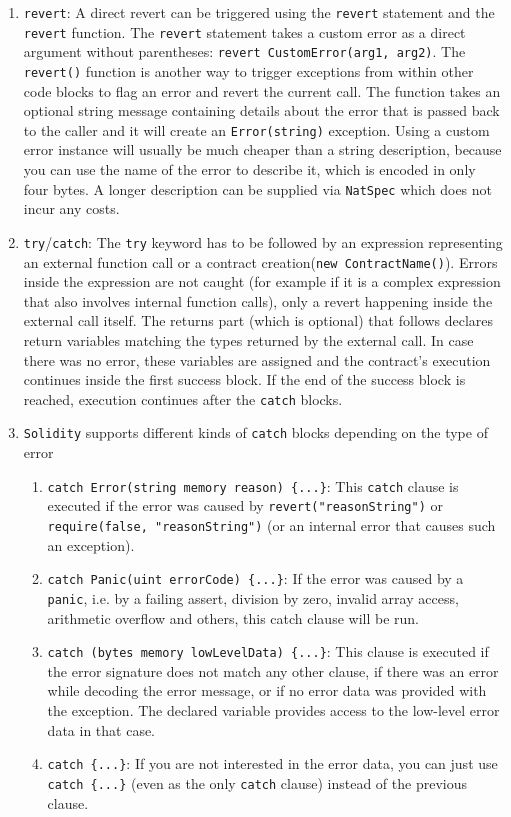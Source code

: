\begin{enumerate}
\item\verb|revert|: A direct revert can be triggered using the \verb|revert| statement and the \verb|revert| function. The \verb|revert| statement takes a custom error as a direct argument without parentheses: \verb|revert CustomError(arg1, arg2)|. The \verb|revert()| function is another way to trigger exceptions from within other code blocks to flag an error and revert the current call. The function takes an optional string message containing details about the error that is passed back to the caller and it will create an \verb|Error(string)| exception. Using a custom error instance will usually be much cheaper than a string description, because you can use the name of the error to describe it, which is encoded in only four bytes. A longer description can be supplied via \verb|NatSpec| which does not incur any costs.

\item\verb|try|/\verb|catch|: The \verb|try| keyword has to be followed by an expression representing an external function call or a contract creation\linebreak(\verb|new ContractName()|). Errors inside the expression are not caught (for example if it is a complex expression that also involves internal function calls), only a revert happening inside the external call itself. The returns part (which is optional) that follows declares return variables matching the types returned by the external call. In case there was no error, these variables are assigned and the contract’s execution continues inside the first success block. If the end of the success block is reached, execution continues after the \verb|catch| blocks.

\item\verb|Solidity| supports different kinds of \verb|catch| blocks depending on the type of error
    \begin{enumerate}
    \item\verb|catch Error(string memory reason) {...}|: This \verb|catch| clause is executed if the error was caused by \verb|revert("reasonString")| or \verb|require(false, "reasonString")| (or an internal error that causes such an exception).
    \item\verb|catch Panic(uint errorCode) {...}|: If the error was caused by a \verb|panic|, i.e. by a failing assert, division by zero, invalid array access, arithmetic overflow and others, this catch clause will be run.
    \item\verb|catch (bytes memory lowLevelData) {...}|: This clause is executed if the error signature does not match any other clause, if there was an error while decoding the error message, or if no error data was provided with the exception. The declared variable provides access to the low-level error data in that case.
    \item\verb|catch {...}|: If you are not interested in the error data, you can just use \verb|catch {...}| (even as the only \verb|catch| clause) instead of the previous clause.
    \end{enumerate}


\end{enumerate}
